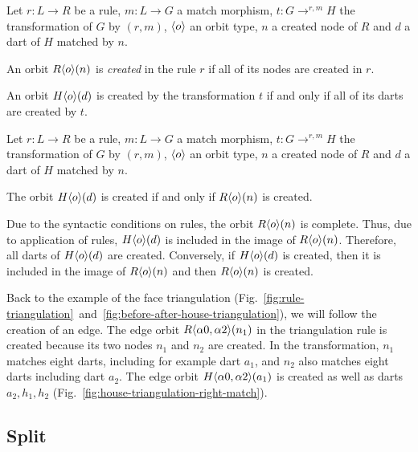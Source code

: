 \documentclass[../main.tex]{subfiles}
\begin{document}
\begin{definition}
  \label{def:orbit-creation} Let $r : L \longrightarrow R$ be a rule,
$m : L \to G$ a match morphism, $t: G \longrightarrow^{r,m} H$ the
transformation of $G$ by $(r,m)$, $\langle o\rangle$ an orbit type, $n$ a created node
of $R$ and $d$ a dart of $H$ matched by $n$.

  An orbit $R\langle o\rangle(n)$ is \emph{created} in the rule $r$ if all of its nodes
are created in $r$.

  An orbit $H\langle o\rangle(d)$ is created by the transformation $t$ if and only if
all of its darts are created by $t$.
\end{definition}

\begin{proposition} Let $r : L \longrightarrow R$ be a rule, $m : L \to G$ a
match morphism, $t: G \longrightarrow^{r,m} H$ the transformation of $G$ by
$(r,m)$, $\langle o\rangle$ an orbit type, $n$ a created node of $R$ and $d$ a dart of
$H$ matched by $n$.

  The orbit $H\langle o\rangle(d)$ is created if and only if $R\langle o\rangle(n)$ is
created.
\end{proposition}

\begin{proofidea} Due to the syntactic conditions on rules, the orbit
$R\langle o\rangle(n)$ is complete. Thus, due to application of rules, $H\langle o\rangle(d)$
is included in the image of $R\langle o\rangle(n)$. Therefore, all darts of
$H\langle o\rangle(d)$ are created. Conversely, if $H\langle o\rangle(d)$ is created, then it
is included in the image of $R\langle o\rangle(n)$ and then $R\langle o\rangle(n)$ is created.
\end{proofidea}

Back to the example of the face triangulation
(Fig.~\ref{fig:rule-triangulation}~and~\ref{fig:before-after-house-triangulation}),
we will follow the creation of an edge. The edge orbit
$R\langle\alpha 0, \alpha 2\rangle(n_{1})$ in the triangulation rule is created
because its two nodes $n_{1}$ and $n_{2}$ are created. In the transformation,
$n_{1}$ matches eight darts, including for example dart $a_{1}$, and $n_{2}$
also matches eight darts including dart $a_{2}$. The edge orbit
$H\langle\alpha 0, \alpha 2\rangle(a_{1})$ is created as well as darts
$a_{2}, h_{1}, h_{2}$ (Fig.~\ref{fig:house-triangulation-right-match}).


\subsection{Split}
\end{document}

